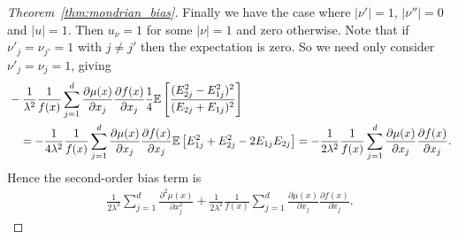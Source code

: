 \begin{proof}[Theorem~\ref{thm:mondrian_bias}]
  Finally we have the case where $|\nu'| = 1$, $|\nu''| = 0$
  and $|u|=1$. Then $u_\nu = 1$ for some $|\nu| = 1$ and zero otherwise.
  Note that if $\nu'_j = \nu_{j'} = 1$ with $j \neq j'$ then the
  expectation is zero. So we need only consider $\nu'_j = \nu_j = 1$, giving
  \begin{align*}
    &- \frac{1}{\lambda^2}
    \frac{1}{f(x)}
    \sum_{j=1}^{d}
    \frac{\partial \mu(x)}{\partial x_j}
    \frac{\partial f(x)}{\partial x_j}
    \frac{1}{4}
    \mathbb{E} \left[
      \frac{(E_{2j}^2 - E_{1j}^2)^2}
      {(E_{2j} + E_{1j})^2}
    \right] \\
    &\quad=
    - \frac{1}{4 \lambda^2}
    \frac{1}{f(x)}
    \sum_{j=1}^{d}
    \frac{\partial \mu(x)}{\partial x_j}
    \frac{\partial f(x)}{\partial x_j}
    \mathbb{E} \left[
      E_{1j}^2
      + E_{2j}^2
      - 2 E_{1j} E_{2j}
    \right]
    =
    - \frac{1}{2 \lambda^2}
    \frac{1}{f(x)}
    \sum_{j=1}^{d}
    \frac{\partial \mu(x)}{\partial x_j}
    \frac{\partial f(x)}{\partial x_j}.
  \end{align*}
  Hence the second-order bias term is
  \begin{align*}
    \frac{1}{2 \lambda^2}
    \sum_{j=1}^d
    \frac{\partial^2 \mu(x)}{\partial x_j^2}
    + \frac{1}{2 \lambda^2}
    \frac{1}{f(x)}
    \sum_{j=1}^{d}
    \frac{\partial \mu(x)}{\partial x_j}
    \frac{\partial f(x)}{\partial x_j}.
  \end{align*}



\end{proof}
